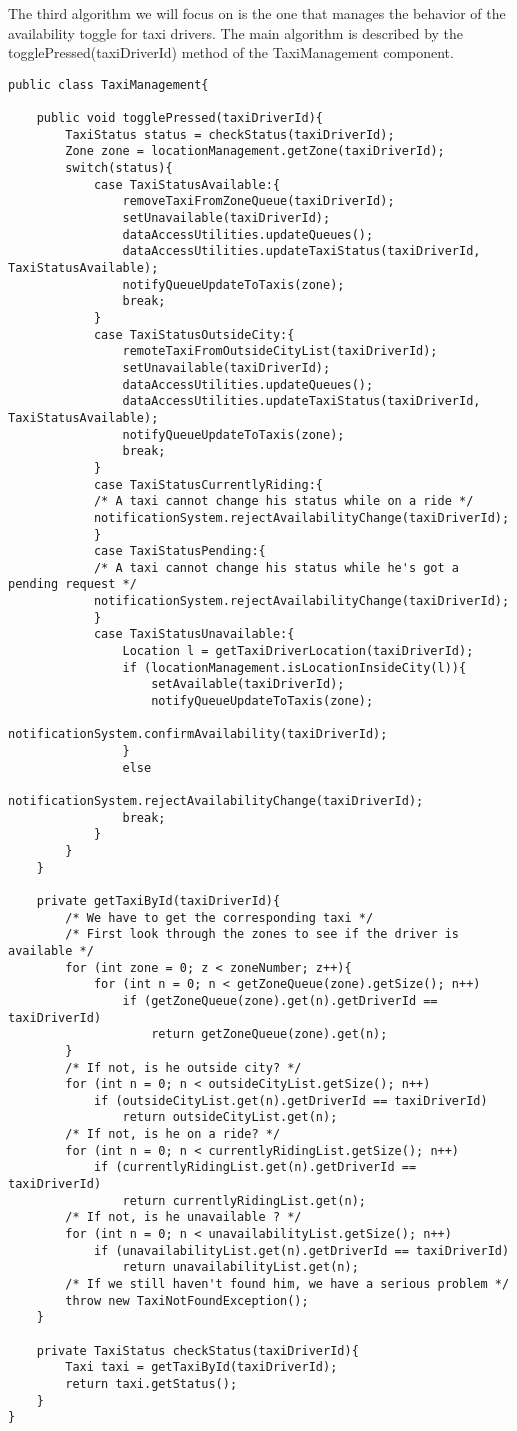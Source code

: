 The third algorithm we will focus on is the one that manages the behavior of the availability toggle for taxi drivers. The main algorithm is described by the togglePressed(taxiDriverId) method of the TaxiManagement component.
\begin{lstlisting}
public class TaxiManagement{

	public void togglePressed(taxiDriverId){
		TaxiStatus status = checkStatus(taxiDriverId);
		Zone zone = locationManagement.getZone(taxiDriverId);
		switch(status){
			case TaxiStatusAvailable:{
				removeTaxiFromZoneQueue(taxiDriverId);
				setUnavailable(taxiDriverId);
				dataAccessUtilities.updateQueues();
				dataAccessUtilities.updateTaxiStatus(taxiDriverId, TaxiStatusAvailable);
				notifyQueueUpdateToTaxis(zone);
				break;
			}
			case TaxiStatusOutsideCity:{
				remoteTaxiFromOutsideCityList(taxiDriverId);
				setUnavailable(taxiDriverId);
				dataAccessUtilities.updateQueues();
				dataAccessUtilities.updateTaxiStatus(taxiDriverId, TaxiStatusAvailable);
				notifyQueueUpdateToTaxis(zone);
				break;
			}
			case TaxiStatusCurrentlyRiding:{
			/* A taxi cannot change his status while on a ride */
			notificationSystem.rejectAvailabilityChange(taxiDriverId);
			}
			case TaxiStatusPending:{
			/* A taxi cannot change his status while he's got a pending request */
			notificationSystem.rejectAvailabilityChange(taxiDriverId);
			}
			case TaxiStatusUnavailable:{
				Location l = getTaxiDriverLocation(taxiDriverId);
				if (locationManagement.isLocationInsideCity(l)){
					setAvailable(taxiDriverId);
					notifyQueueUpdateToTaxis(zone);
					notificationSystem.confirmAvailability(taxiDriverId);
				}
				else 
					notificationSystem.rejectAvailabilityChange(taxiDriverId);
				break;
			}
		}
	}

	private getTaxiById(taxiDriverId){
		/* We have to get the corresponding taxi */
		/* First look through the zones to see if the driver is available */
		for (int zone = 0; z < zoneNumber; z++){
			for (int n = 0; n < getZoneQueue(zone).getSize(); n++)
				if (getZoneQueue(zone).get(n).getDriverId == taxiDriverId)
					return getZoneQueue(zone).get(n);
		}
		/* If not, is he outside city? */
		for (int n = 0; n < outsideCityList.getSize(); n++)
			if (outsideCityList.get(n).getDriverId == taxiDriverId)
				return outsideCityList.get(n);
		/* If not, is he on a ride? */
		for (int n = 0; n < currentlyRidingList.getSize(); n++)
			if (currentlyRidingList.get(n).getDriverId == taxiDriverId)
				return currentlyRidingList.get(n);
		/* If not, is he unavailable ? */
		for (int n = 0; n < unavailabilityList.getSize(); n++)
			if (unavailabilityList.get(n).getDriverId == taxiDriverId)
				return unavailabilityList.get(n);
		/* If we still haven't found him, we have a serious problem */
		throw new TaxiNotFoundException();		
	}

	private TaxiStatus checkStatus(taxiDriverId){
		Taxi taxi = getTaxiById(taxiDriverId);
		return taxi.getStatus();
	}
}
\end{lstlisting}

